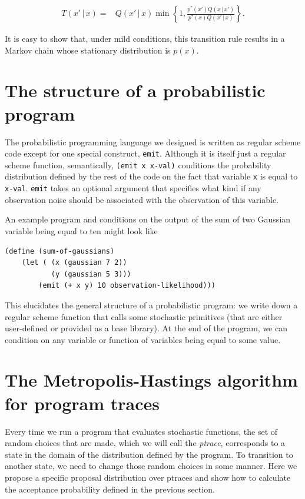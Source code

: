 \documentclass{article}
\begin{document}
\begin{align}
T(x'\, |\, x) =& Q(x' \, |\, x)\min \left \{1, 
                    \frac{p^*(x') Q(x \, |\, x')} 
                    {p^*(x) Q(x' \, |\, x)} \right \}.
                    \label{eq:MHTransitionProb}
\end{align}

It is easy to show that, under mild conditions, this transition rule results in
a Markov chain whose stationary distribution is $p(x)$.

\section{The structure of a probabilistic program}

The probabilistic programming language we designed is written as regular scheme
code except for one special construct, \verb+emit+.  Although it is itself just a
regular scheme function, semantically, \verb+(emit x x-val)+ conditions the
probability distribution defined by the rest of the code on the fact that
variable \verb+x+ is equal to \verb+x-val+. \verb+emit+ takes an optional
argument that specifies what kind if any observation noise should be associated
with the observation of this variable.

An example program and conditions on the output of the sum of two Gaussian
variable being equal to ten might look like

\begin{verbatim}
(define (sum-of-gaussians)
    (let ( (x (gaussian 7 2))
           (y (gaussian 5 3)))
        (emit (+ x y) 10 observation-likelihood)))
\end{verbatim}

This elucidates the general structure of a probabilistic program: we write down
a regular scheme function that calls some stochastic primitives (that are either
user-defined or provided as a base library). At the end of the program, we can
condition on any variable or function of variables being equal to some value. 

\section{The Metropolis-Hastings algorithm for program traces}
Every time we run a program that evaluates stochastic functions, the set of
random choices that are made, which we will call the \emph{ptrace}, corresponds
to a state in the domain of the distribution defined by the program. To
transition to another state, we need to change those random choices in some
manner. Here we propose a specific proposal distribution over ptraces and show
how to calculate the acceptance probability defined in the previous section. 
\end{document}
